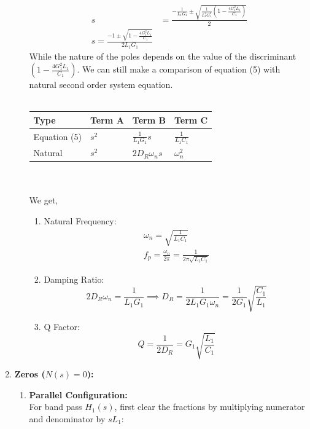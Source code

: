 \begin{enumerate}
\begin{enumerate}
\begin{align*}
          s &= \frac{-\frac{1}{L_1 G_1} \pm \sqrt{\frac{1}{L_1^2 G_1^2} \left(1 - \frac{4 G_1^2 L_1}{C_1}\right)}}{2} \\
          s = \frac{-1 \pm \sqrt{1 - \frac{4 G_1^2 L_1}{C_1}}}{2 L_1 G_1}
        \end{align*}
        While the nature of the poles depends on the value of the
        discriminant \(\left(1 - \frac{4 G_1^2 L_1}{C_1}\right)\).
        We can still make a comparison of equation (5) with natural
        second order system equation.\\ \\
        \begin{tabularx}{\linewidth}{|X|X|X|X|} \hline
          Type & Term A & Term B & Term C \\ \hline
          Equation (5) & \(s^2\) & \(\frac{1}{L_1 G_1} s\) & \(\frac{1}{L_1 C_1}\) \\ \hline
          Natural & \(s^2\) & \(2 D_R \omega_n s\) & \(\omega_n^2\) \\ \hline
        \end{tabularx}\\ \\
        We get,
        \begin{enumerate}
          \item Natural Frequency:
            \begin{align*}
              \omega_n = \sqrt{\frac{1}{L_1 C_1}} \\
              f_p = \frac{\omega_n}{2\pi} = \frac{1}{2\pi \sqrt{L_1 C_1}}
            \end{align*}
          \item Damping Ratio:
            \[
              2 D_R \omega_n = \frac{1}{L_1 G_1} \implies D_R = \frac{1}{2 L_1 G_1 \omega_n} = \frac{1}{2 G_1} \sqrt{\frac{C_1}{L_1}}
            \]
          \item Q Factor:
            \[
              Q = \frac{1}{2D_R} = G_1 \sqrt{\frac{L_1}{C_1}}
            \]
        \end{enumerate}
    \end{enumerate}
  \item \textbf{Zeros (\(N(s) = 0\)):} \\
    \begin{enumerate}
      \item \textbf{Parallel Configuration:}\\
        For band pass \(H_1(s)\), first clear the fractions by multiplying
        numerator and denominator by \(sL_1\):

\end{enumerate}
\end{enumerate}
